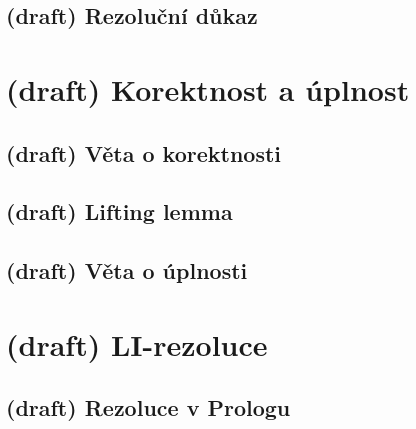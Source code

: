 

\subsection{(draft) Rezoluční důkaz}\todo




\section{(draft) Korektnost a úplnost}\todo



\subsection{(draft) Věta o korektnosti}\todo



\subsection{(draft) Lifting lemma}\todo



\subsection{(draft) Věta o úplnosti}\todo




\section{(draft) LI-rezoluce}\todo



\subsection{(draft) Rezoluce v Prologu}\todo





